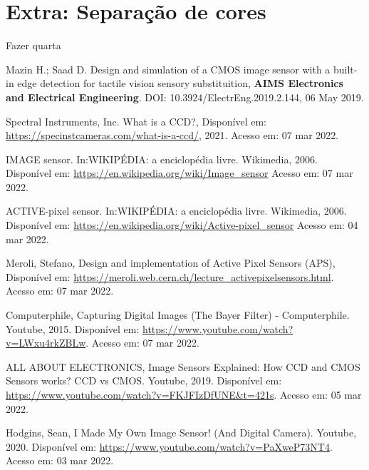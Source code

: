 \documentclass[11pt,a4paper,twocolumn]{article}
\begin{document}
	\section*{Extra: Separação de cores}
	Fazer quarta
	
	\begin{thebibliography}{99}
		{Mazin H.; Saad D. {Design and simulation of a CMOS image sensor with a built-in edge detection for tactile vision sensory substituition}, \textbf{AIMS Electronics and Electrical Engineering}. DOI: 10.3924/ElectrEng.2019.2.144, 06 May 2019.}
		
		{Spectral Instruments, Inc. {What is a CCD?}, Disponível em: \url{https://specinstcameras.com/what-is-a-ccd/}, 2021. Acesso em: 07 mar 2022.}
		
		{IMAGE sensor. In:WIKIPÉDIA: a enciclopédia livre. Wikimedia, 2006. Disponível em: \url{https://en.wikipedia.org/wiki/Image_sensor} Acesso em: 07 mar 2022.}

		{ACTIVE-pixel sensor. In:WIKIPÉDIA: a enciclopédia livre. Wikimedia, 2006. Disponível em: \url{https://en.wikipedia.org/wiki/Active-pixel_sensor} Acesso em: 04 mar 2022.}
		
		{Meroli, Stefano, {Design and implementation of Active Pixel Sensors (APS)}, Disponível em: \url{https://meroli.web.cern.ch/lecture_activepixelsensors.html}. Acesso em: 07 mar 2022.}
		
		{Computerphile, {Capturing Digital Images (The Bayer Filter) - Computerphile}. Youtube, 2015. Disponível em: \url{https://www.youtube.com/watch?v=LWxu4rkZBLw}. Acesso em: 07 mar 2022.}
		
		{ALL ABOUT ELECTRONICS, {Image Sensors Explained: How CCD and CMOS Sensors works? CCD vs CMOS}. Youtube, 2019. Disponível em: \url{https://www.youtube.com/watch?v=FKJFIzDfUNE&t=421s}. Acesso em: 05 mar 2022.}
		
		{Hodgins, Sean, {I Made My Own Image Sensor! (And Digital Camera)}. Youtube, 2020. Disponível em: \url{https://www.youtube.com/watch?v=PaXweP73NT4}. Acesso em: 03 mar 2022.}

	\end{thebibliography}
\end{document}
